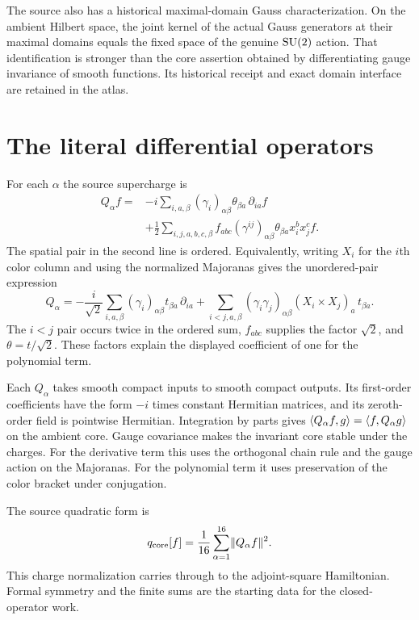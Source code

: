 The source also has a historical maximal-domain Gauss characterization. On the ambient Hilbert space, the joint kernel of the actual Gauss generators at their maximal domains equals the fixed space of the genuine $\operatorname{SU}(2)$ action. That identification is stronger than the core assertion obtained by differentiating gauge invariance of smooth functions. Its historical receipt and exact domain interface are retained in the atlas.

\section{The literal differential operators}
For each $\alpha$ the source supercharge is
\begin{align}
 Q_\alpha f={}&-i\sum_{i,a,\beta}(\gamma_i)_{\alpha\beta}
           \theta_{\beta a}\,\partial_{ia} f \nonumber\\
 &+\frac12\sum_{i,j,a,b,c,\beta}f_{abc}(\gamma^{ij})_{\alpha\beta}
           \theta_{\beta a}x_i^b x_j^c f .
 \label{eq:sourcecharge}
\end{align}
The spatial pair in the second line is ordered. Equivalently, writing $X_i$ for the $i$th color column and using the normalized Majoranas gives the unordered-pair expression
\[
 Q_\alpha=-\frac{i}{\sqrt2}\sum_{i,a,\beta}
       (\gamma_i)_{\alpha\beta}t_{\beta a}\,\partial_{ia}
   +\sum_{i<j,a,\beta}(\gamma_i\gamma_j)_{\alpha\beta}
       (X_i\times X_j)_a\,t_{\beta a}.
\]
The $i<j$ pair occurs twice in the ordered sum, $f_{abc}$ supplies the factor $\sqrt2$, and $\theta=t/\sqrt2$. These factors explain the displayed coefficient of one for the polynomial term.

Each $Q_\alpha$ takes smooth compact inputs to smooth compact outputs. Its first-order coefficients have the form $-i$ times constant Hermitian matrices, and its zeroth-order field is pointwise Hermitian. Integration by parts gives $\langle Q_\alpha f,g\rangle=\langle f,Q_\alpha g\rangle$ on the ambient core. Gauge covariance makes the invariant core stable under the charges. For the derivative term this uses the orthogonal chain rule and the gauge action on the Majoranas. For the polynomial term it uses preservation of the color bracket under conjugation.

The source quadratic form is
\[
 q_{\rm core}[f]=\frac1{16}\sum_{\alpha=1}^{16}\lVert Q_\alpha f\rVert^2 .
\]
This charge normalization carries through to the adjoint-square Hamiltonian. Formal symmetry and the finite sums are the starting data for the closed-operator work.
